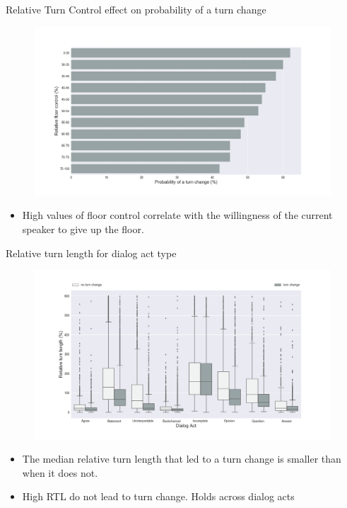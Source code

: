 \begin{frame}{Relative Turn Control effect on probability of a turn change}
\begin{minipage}{0.8\textwidth}
\begin{figure}[H]
\centering
\includegraphics[width=30em]{../scikitlearn/figures/f6.png}\vspace{-1em}
\end{figure}
\end{minipage}
\begin{minipage}{0.8\textwidth}
\begin{itemize}
\item \small{High values of floor control correlate with the willingness of the current speaker to give up the floor.}
\end{itemize}
\end{minipage}
\end{frame}

\begin{frame}{Relative turn length for dialog act type}
\begin{minipage}{0.8\textwidth}
\begin{figure}[H]
\centering
\includegraphics[width=30em]{../scikitlearn/figures/f3.png}\vspace{-1em}
\end{figure}
\end{minipage}
\begin{minipage}{0.8\textwidth}
\begin{itemize}
\item \small{The median relative turn length that led to a turn change is smaller than when it does not.}
\item \small{High RTL do not lead to turn change. Holds across dialog acts} 
\end{itemize}
\end{minipage}
\end{frame}


